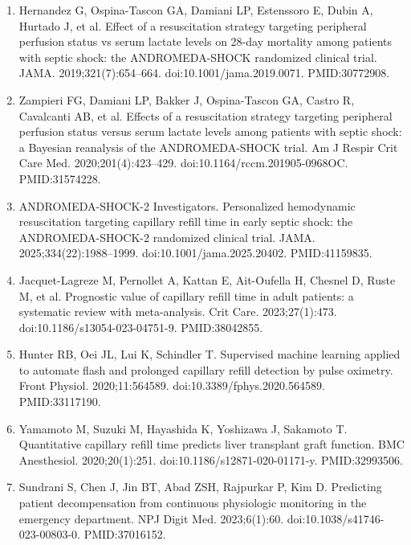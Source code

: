\documentclass[twocolumn,letterpaper,10pt]{article}
\begin{document}
{\small
\begin{enumerate}[leftmargin=2em,itemsep=2pt,label={\arabic*.}]
\sloppy

\item Hernandez G, Ospina-Tascon GA, Damiani LP, Estenssoro E, Dubin A, Hurtado J, et al. Effect of a resuscitation strategy targeting peripheral perfusion status vs serum lactate levels on 28-day mortality among patients with septic shock: the ANDROMEDA-SHOCK randomized clinical trial. JAMA. 2019;321(7):654--664. doi:10.1001/jama.2019.0071. PMID:30772908.

\item Zampieri FG, Damiani LP, Bakker J, Ospina-Tascon GA, Castro R, Cavalcanti AB, et al. Effects of a resuscitation strategy targeting peripheral perfusion status versus serum lactate levels among patients with septic shock: a Bayesian reanalysis of the ANDROMEDA-SHOCK trial. Am J Respir Crit Care Med. 2020;201(4):423--429. doi:10.1164/rccm.201905-0968OC. PMID:31574228.

\item ANDROMEDA-SHOCK-2 Investigators. Personalized hemodynamic resuscitation targeting capillary refill time in early septic shock: the ANDROMEDA-SHOCK-2 randomized clinical trial. JAMA. 2025;334(22):1988--1999. doi:10.1001/jama.2025.20402. PMID:41159835.

\item Jacquet-Lagreze M, Pernollet A, Kattan E, Ait-Oufella H, Chesnel D, Ruste M, et al. Prognostic value of capillary refill time in adult patients: a systematic review with meta-analysis. Crit Care. 2023;27(1):473. doi:10.1186/s13054-023-04751-9. PMID:38042855.

\item Hunter RB, Oei JL, Lui K, Schindler T. Supervised machine learning applied to automate flash and prolonged capillary refill detection by pulse oximetry. Front Physiol. 2020;11:564589. doi:10.3389/fphys.2020.564589. PMID:33117190.

\item Yamamoto M, Suzuki M, Hayashida K, Yoshizawa J, Sakamoto T. Quantitative capillary refill time predicts liver transplant graft function. BMC Anesthesiol. 2020;20(1):251. doi:10.1186/s12871-020-01171-y. PMID:32993506.

\item Sundrani S, Chen J, Jin BT, Abad ZSH, Rajpurkar P, Kim D. Predicting patient decompensation from continuous physiologic monitoring in the emergency department. NPJ Digit Med. 2023;6(1):60. doi:10.1038/s41746-023-00803-0. PMID:37016152.


\end{enumerate}}
\end{document}
